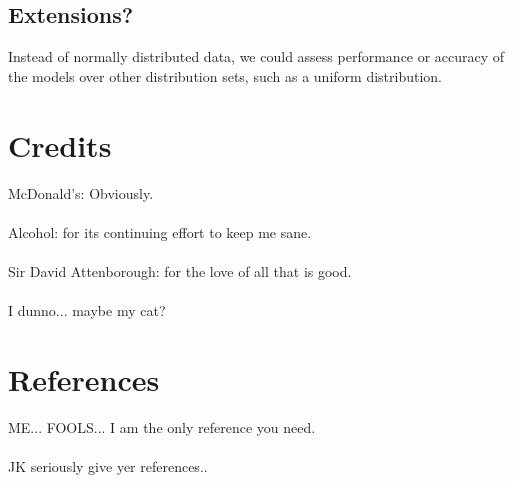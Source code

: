 \documentclass[11pt, oneside]{article}
\begin{document}
\vspace{3.0cm}
\subsection*{Extensions?}
 Instead of normally distributed data, we could assess performance or accuracy of the models over other distribution sets, such as a uniform distribution.
 
\pagebreak
\section{Credits}
McDonald's: Obviously.\\
\\
Alcohol: for its continuing effort to keep me sane.\\
\\
Sir David Attenborough: for the love of all that is good.\\
\\
I dunno... maybe my cat?


\section*{References}
ME... FOOLS... I am the only reference you need.\\
\\
JK seriously give yer references..
\end{document}
